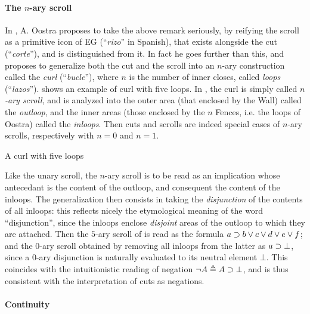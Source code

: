 \paragraph{The $n$-ary scroll}

In \cite{oostra_graficos_2010}, A. Oostra proposes to take the above remark
seriously, by reifying the scroll as a primitive icon of EG (``\emph{rizo}'' in
Spanish), that exists alongside the cut (``\emph{corte}''), and is distinguished
from it. In fact he goes further than this, and proposes to generalize both the
cut and the scroll into an $n$-ary construction called the \emph{curl}
(``\emph{bucle}''), where $n$ is the number of inner closes, called \emph{loops}
(``\emph{lazos}'').  shows an example of curl with five
loops. In \cite{minghui_graphical_2019}, the curl
is simply called \emph{$n$-ary scroll}, and is analyzed into the outer area
(that enclosed by the Wall) called the \emph{outloop}, and the inner areas
(those enclosed by the $n$ Fences, i.e. the loops of Oostra) called the
\emph{inloops}. Then cuts and scrolls are indeed special cases of $n$-ary
scrolls, respectively with $n = 0$ and $n = 1$.

\begin{marginfigure}
  \caption{A curl with five loops}
\end{marginfigure}

Like the unary scroll, the $n$-ary scroll is to be read as an implication whose
antecedant is the content of the outloop, and consequent the content of the
inloops. The generalization then consists in taking the \emph{disjunction} of
the contents of all inloops: this reflects nicely the etymological meaning of
the word ``disjunction'', since the inloops enclose \emph{disjoint} areas of the
outloop to which they are attached. Then the $5$-ary scroll of
 is read as the formula $a \supset b \lor c \lor d \lor e \lor
f$; and the $0$-ary scroll obtained by removing all inloops from the latter as
$a \supset \bot$, since a $0$-ary disjunction is naturally evaluated to its
neutral element $\bot$. This coincides with the intuitionistic reading of
negation $\neg A \triangleq A \supset \bot$, and is thus consistent with the
interpretation of cuts as negations.

\paragraph{Continuity}

